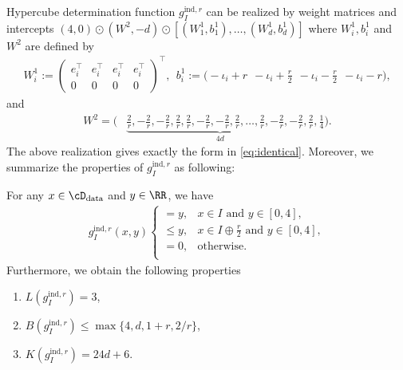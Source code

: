 Hypercube determination function $g_I^{\text{ind},r}$ can be realized by weight matrices and intercepts $(4,0)\odot(W^2,-d)\odot[(W_1^1,b_1^1),\ldots,(W_d^1,b_d^1)]$ where $W_i^1,b_i^1$ and $W^2$ are defined by
\begin{align*}
    W_i^1 := \begin{pmatrix}e_i^\top & e_i^\top & e_i^\top & e_i^\top \\ 0 & 0 & 0 & 0\end{pmatrix}^\top,~~
    b_i^1 := \biggl(-\iota_i + r ~~ -\iota_i + \frac{r}{2} ~~ -\iota_i - \frac{r}{2} ~~ -\iota_i - r \biggr),
\end{align*}
and
\begin{align*}
    W^2 = \bigg(&\underbrace{\frac{2}{r}, -\frac{2}{r}, -\frac{2}{r}, \frac{2}{r},  \frac{2}{r}, -\frac{2}{r}, -\frac{2}{r}, \frac{2}{r}, \dots, \frac{2}{r}, -\frac{2}{r}, -\frac{2}{r}, \frac{2}{r}}_{4d},\frac{1}{4} \bigg).
\end{align*}
The above realization gives exactly the form in \eqref{eq:identical}. Moreover, we summarize the properties of $g_I^{\text{ind},r}$ as following:
\begin{proposition}\label{prop:ind}
    For any $x\in \cD_{\rm data}$ and $y \in \RR$, we have
    \begin{align*}
        g_I^{\text{ind},r}(x,y)
        \begin{cases}
            =y,  &x\in I \text{ and } y \in [0,4], \\
            \leq y,  &x\in I\oplus \frac{r}{2}\text{ and } y \in [0,4], \\
            =0,  &\text{otherwise}. \\
        \end{cases}
    \end{align*}
    Furthermore, we obtain the following properties
    \begin{enumerate}
        \item $L(g_I^{\text{ind},r})=3$,
        \item $B(g_I^{\text{ind},r})\leq \max\{4,d,1+r,2/r\}$,
        \item $K(g_I^{\text{ind},r})=24d+6$.
    \end{enumerate}
\end{proposition}

